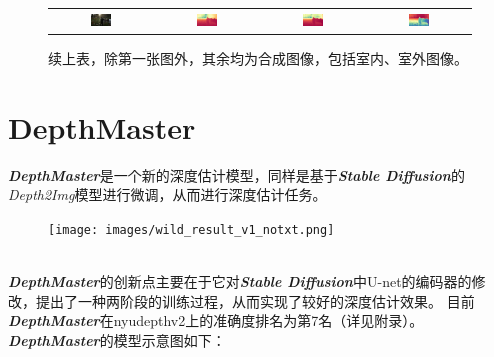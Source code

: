 \documentclass{article}
\begin{document}
\begin{figure}[H]
\begin{tabular}{cccc}
    \includegraphics[width=0.22\textwidth]{images/test-image/synthetic-outside-03.jpg} &
    \includegraphics[width=0.22\textwidth]{images/trained/synthetic-outside-03_pred_colored.png} &
    \includegraphics[width=0.22\textwidth]{images/pretrained/synthetic-outside-03_pred_colored.png} &
    \includegraphics[width=0.22\textwidth]{images/depthmaster/synthetic-outside-03_pred_colored.jpg} \\
  \end{tabular}
  \caption{续上表，除第一张图外，其余均为合成图像，包括室内、室外图像。}
\end{figure}

\newpage

\section{DepthMaster}

\textit{\textbf{DepthMaster}}是一个新的深度估计模型，同样是基于\textit{\textbf{Stable Diffusion}}的\textit{Depth2Img}模型进行微调，从而进行深度估计任务。

\begin{figure}[h!]
  \centering
  \texttt{[image: images/wild\_result\_v1\_notxt.png]}
\end{figure}

\\

\textit{\textbf{DepthMaster}}的创新点主要在于它对\textit{\textbf{Stable Diffusion}}中U-net的编码器的修改，提出了一种两阶段的训练过程，从而实现了较好的深度估计效果。
目前\textit{\textbf{DepthMaster}}在nyudepthv2上的准确度排名为第7名（详见附录）。 \\
\textit{\textbf{DepthMaster}}的模型示意图如下：
\end{document}
